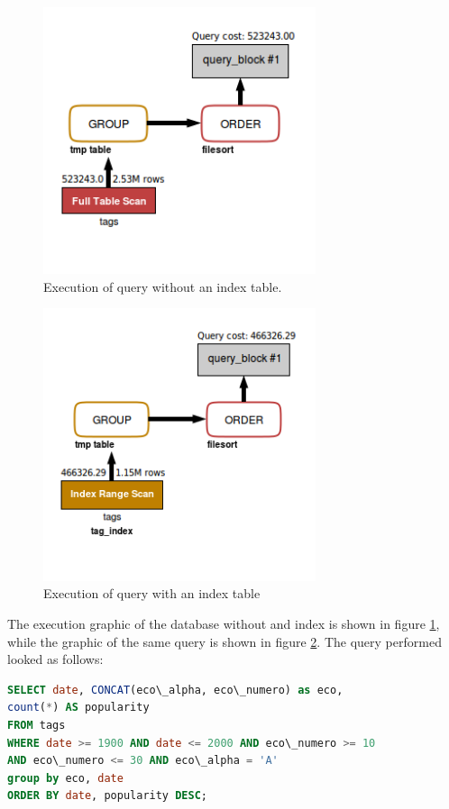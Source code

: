 \documentclass{article}
\begin{document}
\begin{figure}[h]
	\includegraphics[width=8cm]{Query_eco_code_no_index}
	\caption{Execution of query without an index table.}
	\label{figure:2}
\end{figure}

\begin{figure}[h]
	\includegraphics[width=8cm]{Query_eco_code_w_index}
	\caption{Execution of query with an index table}
	\label{figure:3}
\end{figure}



The execution graphic of the database without and index is shown in figure
\ref{figure:2}, while the graphic of the same query is shown in figure
\ref{figure:3}. The query performed looked as follows:

\begin{lstlisting}[language=sql, frame=single]
SELECT date, CONCAT(eco\_alpha, eco\_numero) as eco,
count(*) AS popularity
FROM tags
WHERE date >= 1900 AND date <= 2000 AND eco\_numero >= 10
AND eco\_numero <= 30 AND eco\_alpha = 'A'
group by eco, date
ORDER BY date, popularity DESC;
\end{lstlisting}
\end{document}
